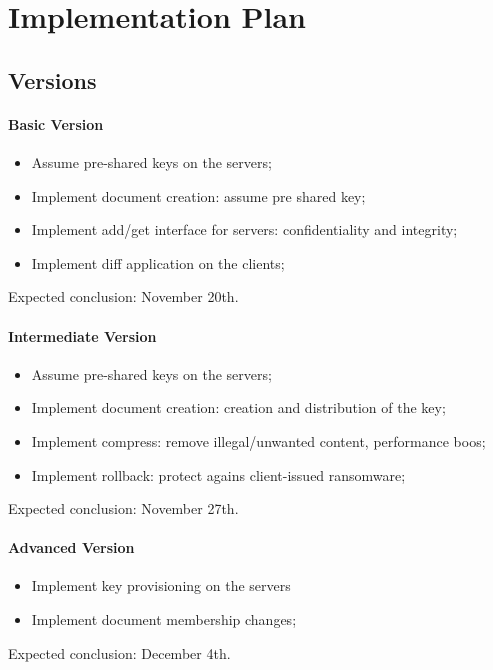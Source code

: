 \section{Implementation Plan}

\subsection{Versions}

\paragraph{Basic Version} {
    \begin{itemize}
        \setlength{\itemsep}{0pt}
        \setlength{\parskip}{0pt}
        \setlength{\parsep}{0pt}
        \item Assume pre-shared keys on the servers;
        \item Implement document creation: assume pre shared key;
        \item Implement add/get interface for servers: confidentiality and integrity;
        \item Implement diff application on the clients;
    \end{itemize}
    Expected conclusion: November 20th.
}

\paragraph{Intermediate Version} {
    \begin{itemize}
        \setlength{\itemsep}{0pt}
        \setlength{\parskip}{0pt}
        \setlength{\parsep}{0pt}
        \item Assume pre-shared keys on the servers;
        \item Implement document creation: creation and distribution of the key;
        \item Implement compress: remove illegal/unwanted content, performance boos;
        \item Implement rollback: protect agains client-issued ransomware;
    \end{itemize}
    Expected conclusion: November 27th.
}

\paragraph{Advanced Version} {
    \begin{itemize}
        \setlength{\itemsep}{0pt}
        \setlength{\parskip}{0pt}
        \setlength{\parsep}{0pt}
        \item Implement key provisioning on the servers
        \item Implement document membership changes;
    \end{itemize}
    Expected conclusion: December 4th.
}


